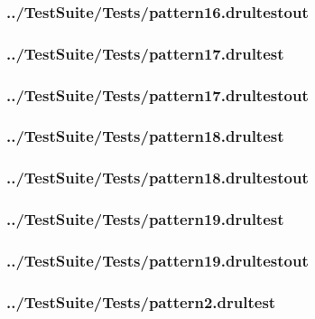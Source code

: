 \begin{changemargin}{-1in}{-1in}
\subsubsection{../TestSuite/Tests/pattern16.drultestout}


\subsubsection{../TestSuite/Tests/pattern17.drultest}


\subsubsection{../TestSuite/Tests/pattern17.drultestout}


\subsubsection{../TestSuite/Tests/pattern18.drultest}


\subsubsection{../TestSuite/Tests/pattern18.drultestout}


\subsubsection{../TestSuite/Tests/pattern19.drultest}


\subsubsection{../TestSuite/Tests/pattern19.drultestout}


\subsubsection{../TestSuite/Tests/pattern2.drultest}



\end{changemargin}

